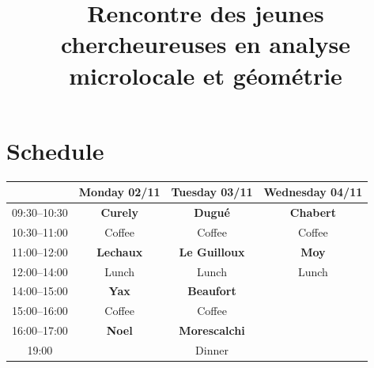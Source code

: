 \documentclass[12pt,a4paper]{amsart}
\newcommand{\speakerone}{\bf Curely}
\newcommand{\speakertwo}{\bf Lechaux}
\newcommand{\speakerthree}{\bf Yax}
\newcommand{\speakerfour}{\bf Noel}
\newcommand{\speakerfive}{\bf Dugué}
\newcommand{\speakersix}{\bf Le Guilloux}
\newcommand{\speakerseven}{\bf Beaufort}
\newcommand{\speakereight}{\bf Morescalchi}
\newcommand{\speakernine}{\bf Chabert}
\newcommand{\speakerten}{\bf Moy}
\begin{document}
\newtheorem{theoreme}{Theorem}
\newtheorem{ex}{Example}
\newtheorem{definition}{Definition}
\newtheorem{lem}{Lemma}
\newtheorem{remarque}{Remark}
\newtheorem{exemple}{Example}
\newtheorem{proposition}{Proposition}
\newtheorem*{theo}{Theorem}
\newtheorem{corolaire}{Corollary}
\newtheorem{hyp}{Hypothesis}
\newtheorem*{rec}{Recurrence Hypothesis}

\renewcommand\Im{\mathrm{Im}~}
\renewcommand\Re{\mathrm{Re}~}
\newcommand\T{\mathbb{T}}
\newcommand\cR{\mathcal{R}}
\newcommand\cL{\mathcal{L}}
\newcommand\cX{\mathcal{X}}
\newcommand\cH{\mathcal{H}}
\newcommand\cK{\mathcal{K}}
\newcommand\Sp{\mathbb{S}}
\newcommand\Vol{\mathrm{Vol}}
\newcommand\spt{\mathrm{spt}}
\newcommand\Tr{\mathrm{Tr}}
\newcommand\WF{\mathrm{WF}}
\newcommand\Res{\mathrm{Res}}
\newcommand\n{\boldsymbol{n}}
\newcommand\dd{\mathrm{d}}
\newcommand\cD{\mathcal{D}}
\newcommand\wit{\widetilde}
\newcommand\red{\textcolor{red}}
\newcommand\hp{\mathcal{T}^{d-1}X}

\title{Rencontre des jeunes chercheureuses en analyse microlocale et géométrie}
\date{}
\maketitle


\section*{Schedule}
\bigskip
\vspace{0.2cm}

\begin{center}
\begin{tabular}{|c|c|c|c|}
\hline
 & Monday 02/11 & Tuesday 03/11 & Wednesday 04/11 \\
\hline

09:30--10:30 
& \speakerone
& \speakerfive
& \speakernine \\

10:30--11:00 
& Coffee
& Coffee 
& Coffee \\

11:00--12:00 
& \speakertwo
& \speakersix
&  \speakerten \\

12:00--14:00
& Lunch
& Lunch 
& Lunch  \\

14:00--15:00 
&  \speakerthree
& \speakerseven
&   \\

15:00--16:00 
& Coffee
& Coffee
&  \\

16:00--17:00 
&  \speakerfour
& \speakereight
&   \\

19:00
& 
& Dinner
&  \\

\hline
\end{tabular}
\end{center}
\vspace{2cm}
\end{document}
